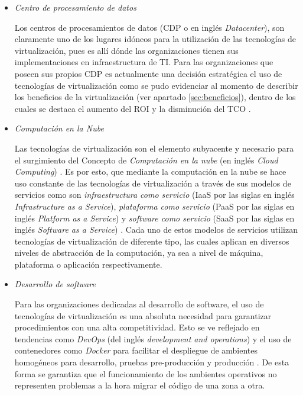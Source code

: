 \begin{itemize}
	\item \textit{Centro de procesamiento de datos}\vspace{3mm} 
	
	Los centros de procesamientos de datos (CDP o en inglés \textit{Datacenter}), son claramente uno de los lugares idóneos para la utilización de las tecnologías de virtualización, pues es allí dónde las organizaciones tienen sus implementaciones en infraestructura de TI.  Para las organizaciones que poseen sus propios CDP es actualmente una decisión estratégica el uso de tecnologías de virtualización como se pudo evidenciar al momento de describir los beneficios de la virtualización (ver  apartado \ref{sec:beneficios}), dentro de los cuales se destaca el aumento del ROI y la disminución del TCO \parencite{Bugnion2017}.\\ 
	
	\item \textit{Computación en la Nube}\vspace{3mm} 
	
	Las tecnologías de virtualización son el elemento subyacente y necesario para el surgimiento del Concepto de \textit{Computación en la nube} (en inglés \textit{Cloud Computing}) \parencite{Souvik2013, Sunilkumar2014}. Es por esto, que mediante la computación en la nube se hace uso constante de las tecnologías de virtualización a través de sus modelos de servicios como son \textit{infraestructura como servicio} (IaaS por las siglas en inglés \textit{Infrastructure as a Service}), \textit{plataforma como servicio} (PaaS por las siglas en inglés \textit{Platform as a Service}) y \textit{software como servicio} (SaaS por las siglas en inglés \textit{Software as a Service}) \parencite{NIST2011}. Cada uno de estos modelos de servicios utilizan tecnologías de virtualización de diferente tipo, las cuales aplican en diversos niveles de abstracción de la computación, ya sea a nivel de máquina, plataforma o aplicación respectivamente.\\
	
	\item \textit{Desarrollo de software}\vspace{3mm}
	
	Para las organizaciones dedicadas al desarrollo de software, el uso de tecnologías de virtualización es una absoluta necesidad para garantizar procedimientos con una alta competitividad. Esto se ve reflejado en tendencias como \textit{DevOps} (del inglés \textit{development and operations}) y el uso de contenedores como \textit{Docker} para facilitar el despliegue de ambientes homogéneos para desarrollo, pruebas pre-producción y producción \parencite{Uphill2017}. De esta forma se garantiza que el funcionamiento de los ambientes operativos no representen problemas a la hora migrar el código de una zona  a otra. \\
	

\end{itemize}
